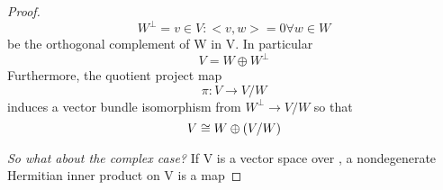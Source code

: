 \begin{proof}
\begin{equation*}
 W^{\perp} = {v \in V: <v,w> = 0 \forall w \in W}
\end{equation*}
be the orthogonal complement of W in V. In particular 
\begin{equation*}
 V = W \oplus W^{\perp}
\end{equation*}
Furthermore, the quotient project map 
\begin{equation*}
 \pi: V \to V/W
\end{equation*}
induces a vector bundle isomorphism from $W^\perp \to V/W$ so that 
\begin{equation*}
 V \cong W \oplus (V/W)
\end{equation*}

\textit{So what about the complex case?}
If V is a vector space over \Cbb, a nondegenerate Hermitian inner product on V is a map 


\end{proof}
